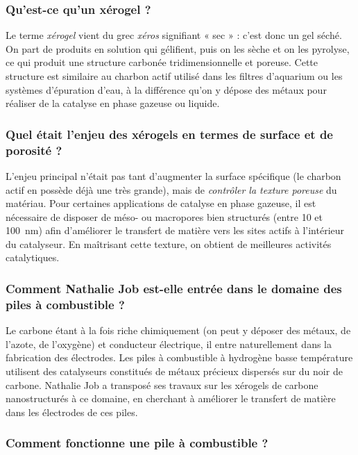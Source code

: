 \subsubsection{Qu'est-ce qu'un xérogel ?}

Le terme \textit{xérogel} vient du grec \textit{xéros} signifiant « sec » : c'est donc un gel séché. On part de produits en solution qui gélifient, puis on les sèche et on les pyrolyse, ce qui produit une structure carbonée tridimensionnelle et poreuse. Cette structure est similaire au charbon actif utilisé dans les filtres d'aquarium ou les systèmes d'épuration d'eau, à la différence qu'on y dépose des métaux pour réaliser de la catalyse en phase gazeuse ou liquide.

\subsubsection{Quel était l'enjeu des xérogels en termes de surface et de porosité ?}

L'enjeu principal n'était pas tant d'augmenter la surface spécifique (le charbon actif en possède déjà une très grande), mais de \textit{contrôler la texture poreuse} du matériau. Pour certaines applications de catalyse en phase gazeuse, il est nécessaire de disposer de méso- ou macropores bien structurés (entre 10 et 100~nm) afin d'améliorer le transfert de matière vers les sites actifs à l'intérieur du catalyseur. En maîtrisant cette texture, on obtient de meilleures activités catalytiques.

\subsubsection{Comment Nathalie Job est-elle entrée dans le domaine des piles à combustible ?}

Le carbone étant à la fois riche chimiquement (on peut y déposer des métaux, de l'azote, de l'oxygène) et conducteur électrique, il entre naturellement dans la fabrication des électrodes. Les piles à combustible à hydrogène basse température utilisent des catalyseurs constitués de métaux précieux dispersés sur du noir de carbone. Nathalie Job a transposé ses travaux sur les xérogels de carbone nanostructurés à ce domaine, en cherchant à améliorer le transfert de matière dans les électrodes de ces piles.

\subsubsection{Comment fonctionne une pile à combustible ?}

